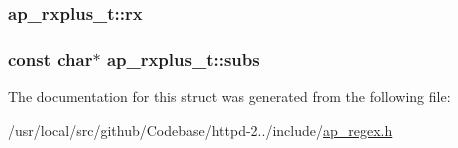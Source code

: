 \subsubsection[{\texorpdfstring{rx}{rx}}]{ ap\+\_\+rxplus\+\_\+t\+::rx}\hypertarget{structap__rxplus__t_a33c4c58e5669f37c8df083c30402ab8a}{}\label{structap__rxplus__t_a33c4c58e5669f37c8df083c30402ab8a}
\subsubsection[{\texorpdfstring{subs}{subs}}]{\setlength{\rightskip}{0pt plus 5cm}const char$\ast$ ap\+\_\+rxplus\+\_\+t\+::subs}\hypertarget{structap__rxplus__t_a41a7e2f61d38dc5ef5c58dcffc31e23e}{}\label{structap__rxplus__t_a41a7e2f61d38dc5ef5c58dcffc31e23e}


The documentation for this struct was generated from the following file\+:\begin{DoxyCompactItemize}
\item 
/usr/local/src/github/\+Codebase/httpd-\/2../include/\hyperlink{ap__regex_8h}{ap\+\_\+regex.\+h}\end{DoxyCompactItemize}
